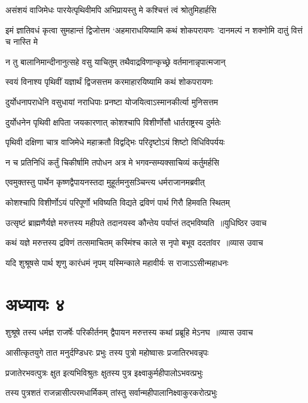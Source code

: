 \twolineshloka
{असंशयं वाजिमेधः पारयेत्पृथिवीमपि}
{अभिप्रायस्तु मे कश्चित्तं त्वं श्रोतुमिहार्हसि}


\threelineshloka
{इमं ज्ञातिवधं कृत्वा सुमहान्तं द्विजोत्तम}
{`अहमाराधयिष्यामि कथं शोकपरायणः}
{'दानमल्पं न शक्नोमि दातुं वित्तं च नास्ति मे}


\twolineshloka
{न तु बालानिमान्दीनानुत्सहे वसु याचितुम्}
{तथैवाद्रविणान्कृच्छ्रे वर्तमानान्नृपात्मजान्}


\twolineshloka
{स्वयं विनाश्य पृथिवीं यज्ञार्थं द्विजसत्तम}
{करमाहारयिष्यामि कथं शोकपरायणः}


\twolineshloka
{दुर्योधनापराधेनि वसुधायां नराधिपाः}
{प्रनष्टा योजयित्वाऽस्मानकीर्त्या मुनिसत्तम}


\twolineshloka
{दुर्योधनेन पृथिवी क्षपिता जयकारणात्}
{कोशश्चापि विशीर्णोसौ धार्तराष्ट्रस्य दुर्मतेः}


\twolineshloka
{पृथिवी दक्षिणा चात्र वाजिमेधे महाक्रतौ}
{विद्वद्भिः परिदृष्टोऽयं शिष्टो विधिविपर्ययः}


\twolineshloka
{न च प्रतिनिधिं कर्तुं चिकीर्षामि तपोधन}
{अत्र मे भगवन्सम्यक्साचिव्यं कर्तुमर्हसि}


\twolineshloka
{एवमुक्तस्तु पार्थेन कृष्णद्वैपायनस्तदा}
{मुहूर्तमनुसञ्चिन्त्य धर्मराजानमब्रवीत्}


\twolineshloka
{कोशश्चापि विशीर्णोऽयं परिपूर्णो भविष्यति}
{विद्यते द्रविणं पार्थ गिरौ हिमवति स्थितम्}


\threelineshloka
{उत्सृष्टं ब्राह्मणैर्यज्ञे मरुत्तस्य महीपते}
{तदानयस्व कौन्तेय पर्याप्तं तद्भविष्यति ॥युधिष्ठिर उवाच}
{}


\threelineshloka
{कथं यज्ञे मरुत्तस्य द्रविणं तत्समाचितम्}
{कस्मिंश्च काले स नृपो बभूव ददतांवर ॥व्यास उवाच}
{}


\twolineshloka
{यदि शुश्रूषसे पार्थ शृणु कारंधमं नृपम्}
{यस्मिन्काले महावीर्यः स राजाऽऽसीन्महाधनः}


\chapter{अध्यायः ४}
\threelineshloka
{शुश्रूषे तस्य धर्मज्ञ राजर्षेः परिकीर्तनम्}
{द्वैपायन मरुत्तस्य कथां प्रब्रूहि मेऽनघ ॥व्यास उवाच}
{}


\twolineshloka
{आसीत्कृतयुगे तात मनुर्दण्डिधरः प्रभुः}
{तस्य पुत्रो महोष्वासः प्रजातिरभवन्नृपः}


\twolineshloka
{प्रजातेरभवत्पुत्रः क्षुत इत्यभिविश्रुतः}
{क्षुतस्य पुत्र इक्ष्वाकुर्महीपालोऽभवत्प्रभुः}


\twolineshloka
{तस्य पुत्रशतं राजन्नासीत्परमधार्मिकम्}
{तांस्तु सर्वान्महीपालानिक्ष्वाकुरकरोत्प्रभुः}


